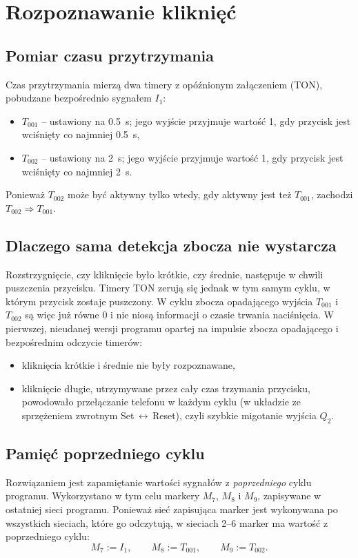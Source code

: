 \section{Rozpoznawanie kliknięć}
\label{sec:zdarzenia}

\subsection{Pomiar czasu przytrzymania}
Czas przytrzymania mierzą dwa timery z opóźnionym załączeniem (TON),
pobudzane bezpośrednio sygnałem $I_1$:
\begin{itemize}
    \item $T_{001}$ -- ustawiony na \SI{0,5}{\second}; jego wyjście
          przyjmuje wartość 1, gdy przycisk jest wciśnięty co najmniej
          \SI{0,5}{\second},
    \item $T_{002}$ -- ustawiony na \SI{2}{\second}; jego wyjście
          przyjmuje wartość 1, gdy przycisk jest wciśnięty co najmniej
          \SI{2}{\second}.
\end{itemize}
Ponieważ $T_{002}$ może być aktywny tylko wtedy, gdy aktywny jest też
$T_{001}$, zachodzi $T_{002} \Rightarrow T_{001}$.

\subsection{Dlaczego sama detekcja zbocza nie wystarcza}
Rozstrzygnięcie, czy kliknięcie było krótkie, czy średnie, następuje
w chwili puszczenia przycisku. Timery TON zerują się jednak w tym samym
cyklu, w którym przycisk zostaje puszczony. W cyklu zbocza opadającego
wyjścia $T_{001}$ i $T_{002}$ są więc już równe 0 i nie niosą
informacji o czasie trwania naciśnięcia. W pierwszej, nieudanej wersji
programu opartej na impulsie zbocza opadającego i bezpośrednim
odczycie timerów:
\begin{itemize}
    \item kliknięcia krótkie i średnie nie były rozpoznawane,
    \item kliknięcie długie, utrzymywane przez cały czas trzymania
          przycisku, powodowało przełączanie telefonu w każdym cyklu
          (w układzie ze sprzężeniem zwrotnym Set\,$\leftrightarrow$\,Reset),
          czyli szybkie migotanie wyjścia $Q_2$.
\end{itemize}

\subsection{Pamięć poprzedniego cyklu}
Rozwiązaniem jest zapamiętanie wartości sygnałów z \emph{poprzedniego}
cyklu programu. Wykorzystano w tym celu markery $M_7$, $M_8$ i $M_9$,
zapisywane w ostatniej sieci programu. Ponieważ sieć zapisująca marker
jest wykonywana po wszystkich sieciach, które go odczytują,
w sieciach 2--6 marker ma wartość z poprzedniego cyklu:
\begin{equation}
    M_7 := I_1,\qquad M_8 := T_{001},\qquad M_9 := T_{002}.
    \label{eq:poprzedni}
\end{equation}

